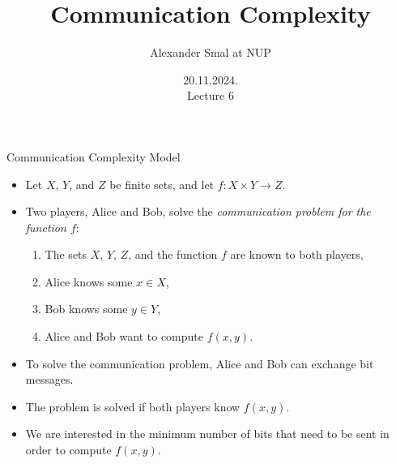 \documentclass[aspectratio=169]{beamer}
\title{Communication Complexity}
\author{Alexander Smal at NUP}
\date{20.11.2024.\\ Lecture 6}
\newcommand{\pitem}{\pause\item}
\begin{document}
\begin{frame}[plain]
    \maketitle
\end{frame}

\begin{frame}{Communication Complexity Model}
    \begin{itemize}
    \item Let $X$, $Y$, and $Z$ be finite sets, and let $f: X \times Y \to Z$.

    \pitem Two players, Alice and Bob, solve the \emph{communication problem for the function $f$}:
    \begin{enumerate}
        \item The sets $X$, $Y$, $Z$, and the function $f$ are known to both players,
        \item Alice knows some $x \in X$,
        \item Bob knows some $y \in Y$,
        \item Alice and Bob want to compute $f(x,y)$.
    \end{enumerate}

    \pitem To solve the communication problem, Alice and Bob can exchange bit messages.

    \pitem The problem is solved if both players know $f(x,y)$.

    \pitem We are interested in the minimum number of bits that need to be sent in order to compute $f(x,y)$.
    \end{itemize}

\end{frame}


\end{document}
